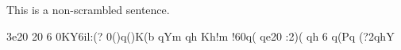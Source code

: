 \documentclass{article}[12pt]
\begin{document}
This is a non-scrambled sentence.

\RobotoSlab
3e20 20 6 0KY6il:(? 0()q()K(b qYm qh Kh!m !60q( qe20 :2)( qh 6 q(Pq (?2qhY
\end{document}
